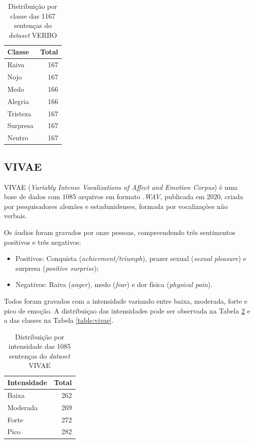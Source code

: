 \begin{table}[!ht]\label{table:verbo}
\centering
\caption{Distribuição por classe das 1167 sentenças do \textit{dataset} VERBO}
    \begin{tabular}{|l|r|}
    \hline
        Classe & Total \\ \hline
        Raiva & 167  \\ \hline
        Nojo & 167  \\ \hline
        Medo & 166  \\ \hline
        Alegria & 166  \\ \hline
        Tristeza & 167  \\ \hline
        Surpresa & 167  \\ \hline
        Neutro & 167  \\ \hline
    \end{tabular}
\end{table}

\subsection{VIVAE}

VIVAE \cite{16} (\textit{Variably Intense Vocalizations of Affect and Emotion Corpus}) é uma base de dados com 1085 arquivos em formato \textit{.WAV}, publicada em 2020, criada por pesquisadores alemães e estadunidenses, formada por vocalizações não verbais.

Os áudios foram gravados por onze pessoas, compreendendo três sentimentos positivos e três negativos:

\begin{itemize}
    \item Positivos: Conquista (\textit{achievment/triumph}), prazer sexual (\textit{sexual pleasure}) e surpresa (\textit{positive surprise});
    \item Negativos: Raiva (\textit{anger}), medo (\textit{fear}) e dor física (\textit{physical pain}).
\end{itemize}

Todos foram gravados com a intensidade variando entre baixa, moderada, forte e pico de emoção. A distribuiçao das intensidades pode ser observada na Tabela \ref{table:vivaeintensidade} e a das classes na Tabela \ref{table:vivae}.

\begin{table}[!ht]\label{table:vivaeintensidade}
    \centering
    \caption{Distribuição por intensidade das 1085 sentenças do \textit{dataset} VIVAE}
    \begin{tabular}{|l|r|}
    \hline
        Intensidade & Total  \\ \hline
        Baixa & 262  \\ \hline
        Moderada & 269  \\ \hline
        Forte & 272  \\ \hline
        Pico & 282  \\ \hline
    \end{tabular}
\end{table}

